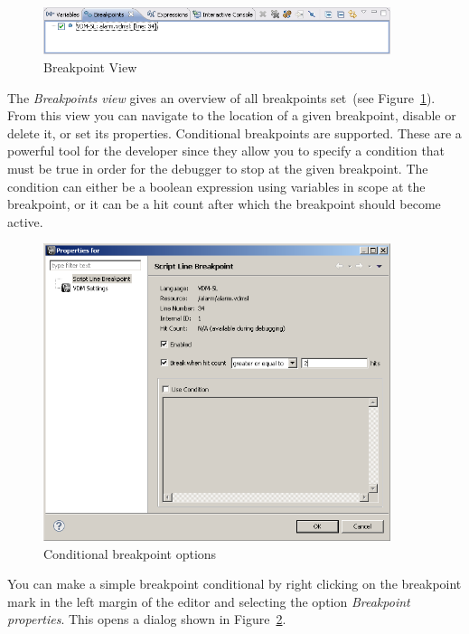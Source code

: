 \begin{figure}[htp]
\begin{center}
  \caption{Breakpoint View}
  \label{fig:BreakpointView}
  \includegraphics[width=4in]{figures/BreakpointView}
\end{center}
\end{figure}

The \emph{Breakpoints view} gives an overview of all breakpoints
set~(see Figure~\ref{fig:BreakpointView}). From this view
you can navigate to the location of a given breakpoint, disable or
delete it, or set its properties.
Conditional breakpoints are supported. These are a powerful tool for
the developer since they allow you to specify a condition that must be
true in order for the debugger to stop at the given breakpoint. The
condition can either be a boolean expression using variables in scope
at the breakpoint, or it can be a hit count after which the breakpoint
should become active.

\begin{figure}[htp]
\begin{center}
  \includegraphics[width=4in]{figures/Breakpointconditional}
  \caption{Conditional breakpoint options}
  \label{fig:BreakpointConditional}
\end{center}
\end{figure}

You can make a simple breakpoint conditional by right clicking on the
breakpoint mark in the left margin of the editor and selecting the
option \emph{Breakpoint properties}. This opens a dialog shown in
Figure~\ref{fig:BreakpointConditional}.

